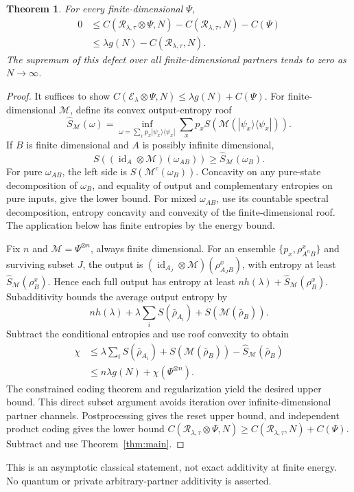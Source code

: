 \documentclass[11pt]{article}
\newtheorem{theorem}{Theorem}
\newcommand{\Rcal}{\mathcal R_{\lambda,\tau}}
\newcommand{\Ecal}{\mathcal E_\lambda}
\newcommand{\id}{\operatorname{id}}
\begin{document}
\begin{theorem}\label{thm:partner}
For every finite-dimensional $\Psi$,
\begin{align*}
0&\le C(\Rcal\otimes\Psi,N)-C(\Rcal,N)-C(\Psi)\\
 &\le\lambda g(N)-C(\Rcal,N).
\end{align*}
The supremum of this defect over all finite-dimensional partners tends
to zero as $N\to\infty$.
\end{theorem}
\begin{proof}
It suffices to show
$C(\Ecal\otimes\Psi,N)\le\lambda g(N)+C(\Psi)$.
For finite-dimensional $\mathcal M$, define its convex output-entropy roof
\[
 \widehat S_{\mathcal M}(\omega)=
 \inf_{\omega=\sum_xp_x|\psi_x\rangle\langle\psi_x|}
       \sum_xp_xS(\mathcal M(|\psi_x\rangle\langle\psi_x|)).
\]
If $B$ is finite dimensional and $A$ is possibly infinite dimensional,
\begin{equation}\label{eq:roof}
 S((\id_A\otimes\mathcal M)(\omega_{AB}))
       \ge\widehat S_{\mathcal M}(\omega_B).
\end{equation}
For pure $\omega_{AB}$, the left side is
$S(\mathcal M^c(\omega_B))$. Concavity on any pure-state decomposition
of $\omega_B$, and equality of output and complementary entropies on
pure inputs, give the lower bound.
For mixed $\omega_{AB}$, use its countable spectral decomposition,
entropy concavity and convexity of the finite-dimensional roof.
The application below has finite entropies by the energy bound.

Fix $n$ and $\mathcal M=\Psi^{\otimes n}$, always finite dimensional.
For an ensemble $\{p_x,\rho^x_{A^nB}\}$ and surviving subset $J$,
the output is $(\id_{A_J}\otimes\mathcal M)(\rho^x_{A_JB})$,
with entropy at least $\widehat S_{\mathcal M}(\rho^x_B)$.
Hence each full output has entropy at least
$nh(\lambda)+\widehat S_{\mathcal M}(\rho^x_B)$.
Subadditivity bounds the average output entropy by
\[
 nh(\lambda)+\lambda\sum_iS(\bar\rho_{A_i})
                         +S(\mathcal M(\bar\rho_B)).
\]
Subtract the conditional entropies and use roof convexity to obtain
\begin{align*}
\chi&\le\lambda\sum_iS(\bar\rho_{A_i})
       +S(\mathcal M(\bar\rho_B))-\widehat S_{\mathcal M}(\bar\rho_B)\\
    &\le n\lambda g(N)+\chi(\Psi^{\otimes n}).
\end{align*}
The constrained coding theorem and regularization \cite{holevo} yield
the desired upper bound. This direct subset argument avoids iteration
over infinite-dimensional partner channels.
Postprocessing gives the reset upper bound, and independent product
coding gives the lower bound
$C(\Rcal\otimes\Psi,N)\ge C(\Rcal,N)+C(\Psi)$.
Subtract and use Theorem~\ref{thm:main}.
\end{proof}
This is an asymptotic classical statement, not exact additivity at finite
energy. No quantum or private arbitrary-partner additivity is asserted.
\end{document}
